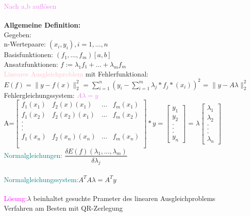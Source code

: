 \documentclass[../ZF_HM2.tex]{subfiles}
\begin{document}
\textcolor{violet}{Nach a,b auflösen}\\\\
\textbf{Allgemeine Definition:}\\
Gegeben:\\ n-Wertepaare: $(x_i,y_i), i=1,...,n$\\
Basisfunktionen: $(f_1,...,f_m) [a,b]$\\
Ansatzfunktionen: $f:= \lambda_1f_1+...+\lambda_mf_m$\\


\textcolor{pink}{Lineares Ausgleichproblem} mit Fehlerfunktional:\\
$E(f)= \|y-f(x)\|_2^2$ = $\sum_{i=1}^{n}(y_i - \sum_{i=1}^{m}\lambda_j*f_j*(x_i))^2$ = $\|y-A\lambda\|_2^2$\\
\colorbox{violet!30}{Fehlergleichungssystem:} \textcolor{violet}{$A\lambda=y$}\\
A=$ \left[\begin {matrix}
f_1(x_1) & f_2(x)(x_1)&...&f_m(x_1)\\
f_1(x_2) & f_2(x_2)(x_1)&...&f_m(x_2)\\
.&&&\\
.\\
.\\
f_1(x_n) & f_2(x_n)(x_n)&...&f_m(x_n)\\\\
\end{matrix}\right] *
y= \left[\begin {matrix}y_1\\
y_2\\
.\\
.\\
.\\
y_n
\end{matrix}\right]$
= $\lambda
 \left[\begin {matrix}\lambda_1\\
\lambda_2\\
.\\
.\\
.\\
\lambda_n
\end{matrix}\right]$
\\
\textcolor{teal}{Normalgleichungen:} $\dfrac{\delta E(f)(\lambda_1,...,\lambda_m)}{\delta\lambda_j}$ \\\\
\textcolor{teal}{Normalgleichungssystem:}$A^TA\lambda=A^Ty$\\\\
\textcolor{magenta}{Lösung:}$\lambda$ beinhaltet gesuchte Prameter des linearen Ausgleichproblems\\
Verfahren am Besten mit QR-Zerlegung
\end{document}
